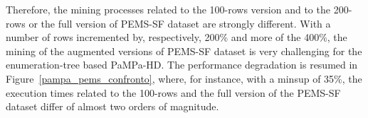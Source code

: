 Therefore, the mining processes related to the 100-rows version and to the 200-rows or the full version of PEMS-SF dataset are strongly different. With a number of rows incremented by, respectively, 200\% and more of the 400\%, the mining of the augmented versions of PEMS-SF dataset is very challenging for the enumeration-tree based PaMPa-HD.
The performance degradation is resumed in Figure~\ref{pampa_pems_confronto}, where, for instance, with a minsup of 35\%, the execution times related to the 100-rows and the full version of the PEMS-SF dataset differ of almost two orders of magnitude.

